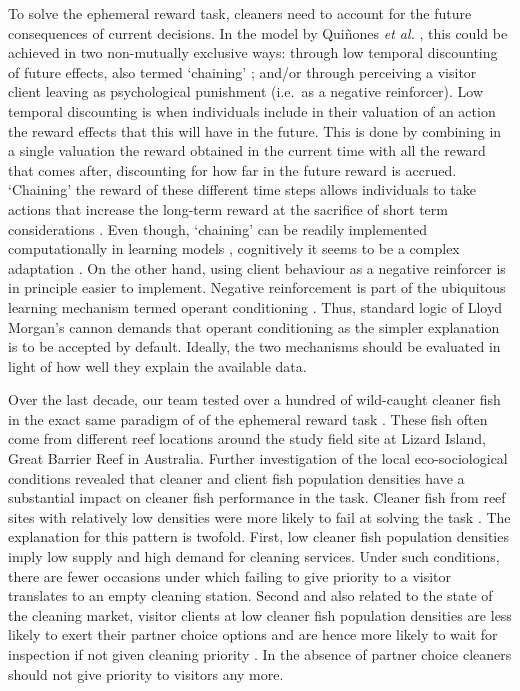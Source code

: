 \documentclass[]{rsos}%
\begin{document}
To solve the ephemeral reward task, cleaners need to account for
the future consequences of current decisions. In the model by
Quiñones \emph{et al.} \citep{quinones_Reinforcement_2019}, this could be achieved in
two non-mutually exclusive ways: through low temporal discounting of
future effects, also termed `chaining' \citep{enquist_Power_2016}; and/or
through perceiving a visitor client leaving as psychological punishment
(i.e.~as a negative reinforcer). Low temporal discounting is when
individuals include in their valuation of an action the reward effects
that this will have in the future. This is done by combining in a single
valuation the reward obtained in the current time with all the reward that
comes after, discounting for how far in the future reward
is accrued. `Chaining' the reward of these different time steps allows
individuals to take actions that increase the long-term reward at the sacrifice
of short term considerations \citep{enquist_Power_2016}. Even though, `chaining'
can be readily implemented computationally in learning models
\citep{enquist_Power_2016, sutton_Reinforcement_2018}, cognitively it seems to be
a complex adaptation \citep{suddendorf_Evolution_2007}. On the other hand,
using client behaviour as a negative reinforcer is in principle
easier to implement. Negative reinforcement is part of the ubiquitous
learning mechanism termed operant conditioning \citep{thorndike_Animal_1898, skinner_Behavior_1938}. Thus, standard logic of
Lloyd Morgan's cannon demands that operant conditioning as the simpler
explanation is to be accepted by default. Ideally, the two mechanisms should
be evaluated in light of how well they explain the available data.

Over the last decade, our team tested over a hundred of wild-caught
cleaner fish in the exact same paradigm of of the ephemeral reward
task \citep{salwiczek_Adult_2012, wismer_Variation_2014, triki_Decrease_2018, triki_Biological_2019, triki_Brain_2020}. These fish often come from
different reef locations around the study field site at Lizard Island,
Great Barrier Reef in Australia. Further investigation of the local
eco-sociological conditions revealed that cleaner and client
fish population densities have a substantial impact on cleaner fish
performance in the task. Cleaner fish from reef sites with relatively
low densities were more likely to fail at solving the task \citep{triki_Biological_2019, triki_Decrease_2018, wismer_Variation_2014}. The explanation for this pattern
is twofold. First, low cleaner fish population densities imply
low supply and high demand for cleaning services.
Under such conditions, there are fewer occasions under
which failing to give priority to a visitor translates to an empty
cleaning station. Second and also related to the state of the cleaning market,
visitor clients at low cleaner fish population densities
are less likely to exert their partner choice options
and are hence more likely to wait for inspection if not given cleaning
priority \citep{triki_Brain_2020}. In the absence of partner choice
cleaners should not give priority to visitors any more.
\end{document}
